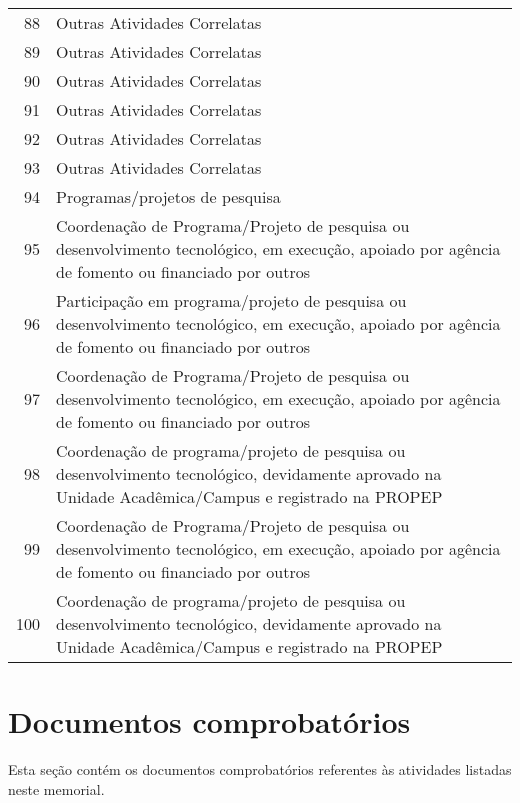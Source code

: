 \documentclass[a4paper,oneside,10pt]{article}
\newcounter{document}%
\begin{document}
{\begin{longtable}[H]{@{} r P{8cm} @{}}
88 & {Outras Atividades Correlatas}\\
89 & {Outras Atividades Correlatas}\\
90 & {Outras Atividades Correlatas}\\
91 & {Outras Atividades Correlatas}\\
92 & {Outras Atividades Correlatas}\\
93 & {Outras Atividades Correlatas}\\
94 & {Programas/projetos de pesquisa}\\
95 & {Coordenação de Programa/Projeto de pesquisa ou desenvolvimento tecnológico, em execução, apoiado por agência de fomento ou financiado por outros}\\
96 & {Participação em programa/projeto de pesquisa ou desenvolvimento tecnológico, em execução, apoiado por agência de fomento ou financiado por outros}\\
97 & {Coordenação de Programa/Projeto de pesquisa ou desenvolvimento tecnológico, em execução, apoiado por agência de fomento ou financiado por outros}\\
98 & {Coordenação de programa/projeto de pesquisa ou desenvolvimento tecnológico, devidamente aprovado na Unidade Acadêmica/Campus e registrado na PROPEP}\\
99 & {Coordenação de Programa/Projeto de pesquisa ou desenvolvimento tecnológico, em
execução, apoiado por agência de fomento ou financiado por outros}\\
100 & {Coordenação de programa/projeto de pesquisa ou desenvolvimento tecnológico,
devidamente aprovado na Unidade Acadêmica/Campus e registrado na PROPEP}\\
\end{longtable}}

\clearpage
\appendix
\newpage
\section{Documentos comprobatórios}
Esta seção contém os documentos comprobatórios referentes às atividades listadas neste memorial.
\renewcommand{\thesubsection}{\arabic{subsection}}


\end{document}
